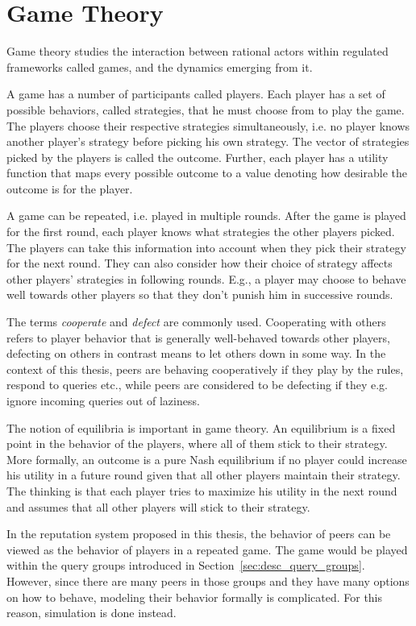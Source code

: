 \section{Game Theory}
Game theory studies the interaction between rational actors within regulated
frameworks called games, and the dynamics emerging from it.

A game has a number of participants called players. Each player has a set of
possible behaviors, called strategies, that he must choose from to play the
game. The players choose their respective strategies simultaneously, i.e. no
player knows another player's strategy before picking his own strategy. The
vector of strategies picked by the players is called the outcome. Further, each
player has a utility function that maps every possible outcome to a value
denoting how desirable the outcome is for the player.

A game can be repeated, i.e. played in multiple rounds. After the game is played
for the first round, each player knows what strategies the other players picked.
The players can take this information into account when they pick their strategy
for the next round. They can also consider how their choice of strategy affects
other players' strategies in following rounds. E.g., a player may choose to
behave well towards other players so that they don't punish him in successive
rounds.

The terms \emph{cooperate} and \emph{defect} are commonly used. Cooperating with
others refers to player behavior that is generally well-behaved towards other
players, defecting on others in contrast means to let others down in some way.
In the context of this thesis, peers are behaving cooperatively if they play by
the rules, respond to queries etc., while peers are considered to be defecting
if they e.g. ignore incoming queries out of laziness.

The notion of equilibria is important in game theory. An equilibrium is a fixed
point in the behavior of the players, where all of them stick to their strategy.
More formally, an outcome is a pure Nash equilibrium if no player could increase
his utility in a future round given that all other players maintain their
strategy. The thinking is that each player tries to maximize his utility in the
next round and assumes that all other players will stick to their strategy.

In the reputation system proposed in this thesis, the behavior of peers can be
viewed as the behavior of players in a repeated game. The game would be played
within the query groups introduced in Section~\ref{sec:desc_query_groups}.
However, since there are many peers in those groups and they have many options
on how to behave, modeling their behavior formally is complicated. For this
reason, simulation is done instead.
